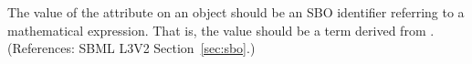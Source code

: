 The value of the attribute  on an \EventAssignment object
should be an SBO identifier referring to a mathematical expression.  That
is, the value should be a term derived from \sbomathformula.  (References:
SBML L3V2 Section~\ref{sec:sbo}.)
